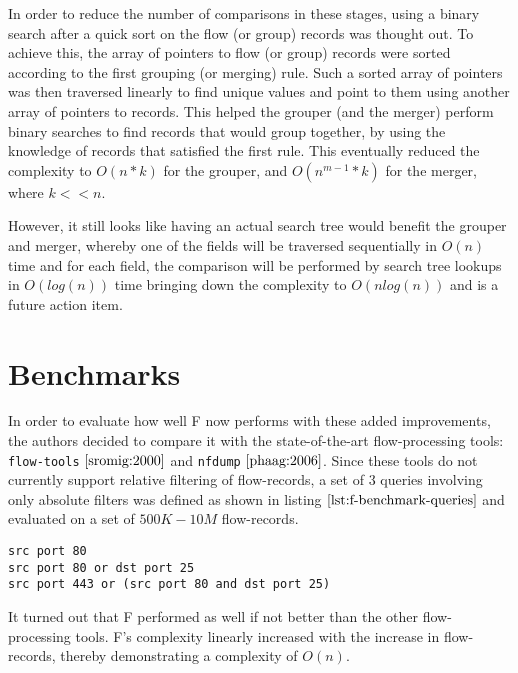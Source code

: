 In order to reduce the number of comparisons in these stages, using a binary search after a quick sort on the flow (or group) records was thought out. To achieve this, the array of pointers to flow (or group) records were sorted according to the first grouping (or merging) rule. Such a sorted array of pointers was then  traversed linearly to find unique values and point to them using another array of pointers to records. This helped the grouper (and the merger) perform binary searches to find records that would group together, by using the knowledge of records that satisfied the first rule. This eventually reduced the complexity to $O(n*k)$ for the grouper, and $O(n^{m-1} *k)$ for the merger, where $k << n$. 

However, it still looks like having an actual search tree would benefit the grouper and merger, whereby one of the fields will be traversed sequentially in $O(n)$  time and for each field, the comparison will be performed by search tree lookups in $O(log(n))$ time bringing down the complexity to $O(nlog(n))$ and is a future action item.

\section{Benchmarks}\label{sec:f-benchmarks}
In order to evaluate how well F now performs with these added improvements, the authors decided to compare it with the state-of-the-art flow-processing tools: \texttt{flow-tools} $\cite{sromig:2000}$ and \texttt{nfdump} $\cite{phaag:2006}$. Since these tools do not currently support relative filtering of flow-records, a set of $3$ queries involving only absolute filters was defined as shown in listing $\ref{lst:f-benchmark-queries}$ and evaluated on a set of $500K-10M$ flow-records.  

\begin{lstlisting}
src port 80
src port 80 or dst port 25
src port 443 or (src port 80 and dst port 25)
\end{lstlisting}

It turned out that F performed as well if not better than the other flow-processing tools. F's complexity linearly increased with the increase in flow-records, thereby demonstrating a complexity of $O(n)$.